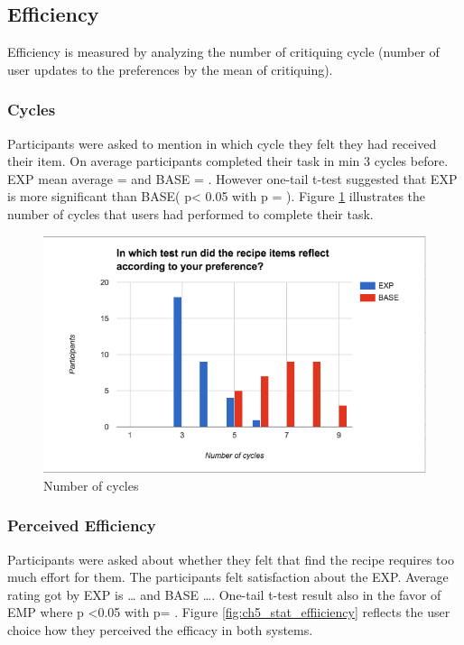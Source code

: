 \subsection{Efficiency}

Efficiency is measured by analyzing the number of critiquing cycle (number of user updates to the preferences by the mean of critiquing). 

\subsubsection{Cycles}
 Participants were asked to mention in which cycle they felt they had received their item.  On average participants completed their task in min 3 cycles before.  EXP mean average  = and BASE  = . However one-tail t-test suggested that EXP is more significant than BASE( p< 0.05 with p = ). Figure \ref{fig:ch5_stat_efficiency_cycles} illustrates the number of cycles that users had performed to complete their task. 

\begin{figure}[h]
	\centering
	\includegraphics[width= 1\linewidth]{figures/ch5_stat_efficiency_cycles}
	\caption{Number of cycles}
	\label{fig:ch5_stat_efficiency_cycles}
\end{figure}

\subsubsection{Perceived Efficiency}

Participants were asked about whether they felt that find the recipe requires too much effort for them. The participants felt satisfaction about the EXP. Average rating got by EXP is … and BASE …. One-tail t-test result also in the favor of EMP where p <0.05 with p= . Figure \ref{fig:ch5_stat_effiiciency} reflects the user choice how they perceived the efficacy in both systems.


